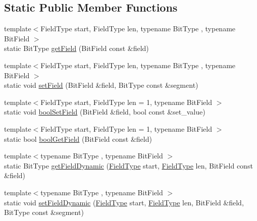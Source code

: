 \subsection*{Static Public Member Functions}
\begin{DoxyCompactItemize}
\item 
{\footnotesize template$<$Field\+Type start, Field\+Type len, typename Bit\+Type , typename Bit\+Field $>$ }\\static Bit\+Type \hyperlink{structvt_1_1utils_1_1_bit_packer_afe31d75cc9a9198eb732b759424a0535}{get\+Field} (Bit\+Field const \&field)
\item 
{\footnotesize template$<$Field\+Type start, Field\+Type len, typename Bit\+Type , typename Bit\+Field $>$ }\\static void \hyperlink{structvt_1_1utils_1_1_bit_packer_a4bffe5bd05d11955016e5f8f9161893b}{set\+Field} (Bit\+Field \&field, Bit\+Type const \&segment)
\item 
{\footnotesize template$<$Field\+Type start, Field\+Type len = 1, typename Bit\+Field $>$ }\\static void \hyperlink{structvt_1_1utils_1_1_bit_packer_ab5881dc40c79ea4043121a2394e603bc}{bool\+Set\+Field} (Bit\+Field \&field, bool const \&set\+\_\+value)
\item 
{\footnotesize template$<$Field\+Type start, Field\+Type len = 1, typename Bit\+Field $>$ }\\static bool \hyperlink{structvt_1_1utils_1_1_bit_packer_ad913a3121b60959166b1fba7de596cff}{bool\+Get\+Field} (Bit\+Field const \&field)
\item 
{\footnotesize template$<$typename Bit\+Type , typename Bit\+Field $>$ }\\static Bit\+Type \hyperlink{structvt_1_1utils_1_1_bit_packer_a0f6dd347c6375101ff5f4c9dd4e8413d}{get\+Field\+Dynamic} (\hyperlink{structvt_1_1utils_1_1_bit_packer_a23024285425933c1f10c8fc3942f9beb}{Field\+Type} start, \hyperlink{structvt_1_1utils_1_1_bit_packer_a23024285425933c1f10c8fc3942f9beb}{Field\+Type} len, Bit\+Field const \&field)
\item 
{\footnotesize template$<$typename Bit\+Type , typename Bit\+Field $>$ }\\static void \hyperlink{structvt_1_1utils_1_1_bit_packer_a9d000b5dcc34456e43cbff50fafa3fb9}{set\+Field\+Dynamic} (\hyperlink{structvt_1_1utils_1_1_bit_packer_a23024285425933c1f10c8fc3942f9beb}{Field\+Type} start, \hyperlink{structvt_1_1utils_1_1_bit_packer_a23024285425933c1f10c8fc3942f9beb}{Field\+Type} len, Bit\+Field \&field, Bit\+Type const \&segment)
\end{DoxyCompactItemize}
